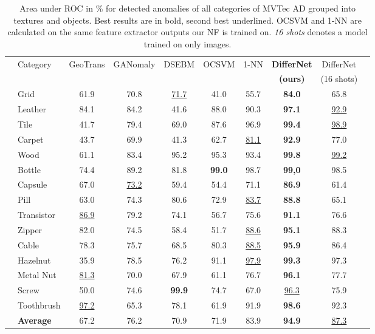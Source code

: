 \documentclass[10pt,twocolumn,letterpaper]{article}
\begin{document}
\begin{table*}
\begin{center}
\begin{tabular}{c|l|c|c|c|c|c|c|c|c|}
\cline{2-9}
& Category & GeoTrans & GANomaly & DSEBM & OCSVM & 1-NN & \textbf{DifferNet} & DifferNet\\
 & & \cite{geotrans} &\cite{ganomaly}  & \cite{dsebm} & \cite{andrews}& \cite{nazare}& \textbf{(ours)} & (16 shots)\\
\cline{2-9}
& Grid       & 61.9 & 70.8 & \underline{71.7} & 41.0 & 55.7 & \textbf{84.0} & 65.8\\
& Leather    & 84.1 & 84.2 & 41.6 & 88.0 & 90.3 & \textbf{97.1} & \underline{92.9}\\
& Tile       & 41.7 & 79.4 & 69.0 & 87.6 & 96.9 & \textbf{99.4} & \underline{98.9}\\
\rotatebox[origin=c]{90}{\parbox[c]{0cm}{Textures}}& Carpet     & 43.7 & 69.9 & 41.3 & 62.7 & \underline{81.1} & \textbf{92.9} & 77.0\\
& Wood       & 61.1 & 83.4 & 95.2 & 95.3 & 93.4 & \textbf{99.8} & \underline{99.2}\\
\cline{2-9}& Bottle     & 74.4 & 89.2 & 81.8 & \textbf{99.0}& 98.7 & \textbf{99,0}  & 98.5\\
& Capsule    & 67.0 & \underline{73.2} & 59.4 & 54.4 & 71.1 & \textbf{86.9} & 61.4\\
& Pill       & 63.0 & 74.3 & 80.6 & 72.9 & \underline{83.7} & \textbf{88.8} & 65.1 \\
& Transistor & \underline{86.9} & 79.2 & 74.1 & 56.7 & 75.6 & \textbf{91.1} & 76.6\\
& Zipper     & 82.0 & 74.5 & 58.4 & 51.7 & \underline{88.6} & \textbf{95.1} & 88.3 \\
\rotatebox[origin=c]{90}{\parbox[c]{0cm}{Objects}}& Cable      & 78.3 & 75.7 & 68.5 & 80.3 & \underline{88.5} & \textbf{95.9} & 86.4 \\
& Hazelnut   & 35.9 & 78.5 & 76.2 & 91.1 & \underline{97.9} & \textbf{99.3} & 97.3\\
& Metal Nut  & \underline{81.3} & 70.0 & 67.9 & 61.1 & 76.7 & \textbf{96.1} & 77.7\\
& Screw      & 50.0 & 74.6 & \textbf{99.9} & 74.7 & 67.0 & \underline{96.3} & 75.9\\
& Toothbrush & \underline{97.2} & 65.3 & 78.1 & 61.9 & 91.9 & \textbf{98.6} & 92.3\\
\cline{2-9}
& \textbf{Average} & 67.2 & 76.2 & 70.9 & 71.9 & 83.9 &\textbf{94.9} & \underline{87.3}\\
\cline{2-9}
\end{tabular}
\end{center}
\caption{Area under ROC in \% for detected anomalies of all categories of MVTec AD \cite{mvtec} grouped into textures and objects. Best results are in bold, second best underlined. OCSVM and 1-NN are calculated on the same feature extractor outputs our NF is trained on. \textit{16 shots} denotes a model trained on only  images.}
\label{table:mvtec}
\end{table*}
\end{document}
